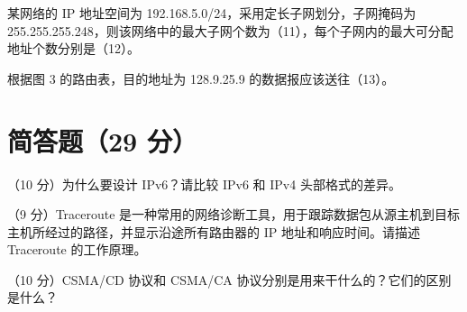 \begin{question}[index=6]
某网络的 IP 地址空间为 192.168.5.0/24，采用定长子网划分，子网掩码为 255.255.255.248，则该网络中的最大子网个数为（11）\underline{\hspace{2em}}，每个子网内的最大可分配地址个数分别是（12）\underline{\hspace{2em}}。
\end{question}
\begin{question}[index=7]
根据图 3 的路由表，目的地址为 128.9.25.9 的数据报应该送往（13）\underline{\hspace{5em}}。
\par\smallskip\noindent{}
\par\noindent{}
\end{question}
\newpage
{}
\section{简答题（29 分）}
\begin{question}[index=1]
（10 分）为什么要设计 IPv6？请比较 IPv6 和 IPv4 头部格式的差异。
\end{question}
\begin{question}[index=2]
（9 分）Traceroute 是一种常用的网络诊断工具，用于跟踪数据包从源主机到目标主机所经过的路径，并显示沿途所有路由器的 IP 地址和响应时间。请描述 Traceroute 的工作原理。
\end{question}
\begin{question}[index=3]
（10 分）CSMA/CD 协议和 CSMA/CA 协议分别是用来干什么的？它们的区别是什么？
\end{question}
